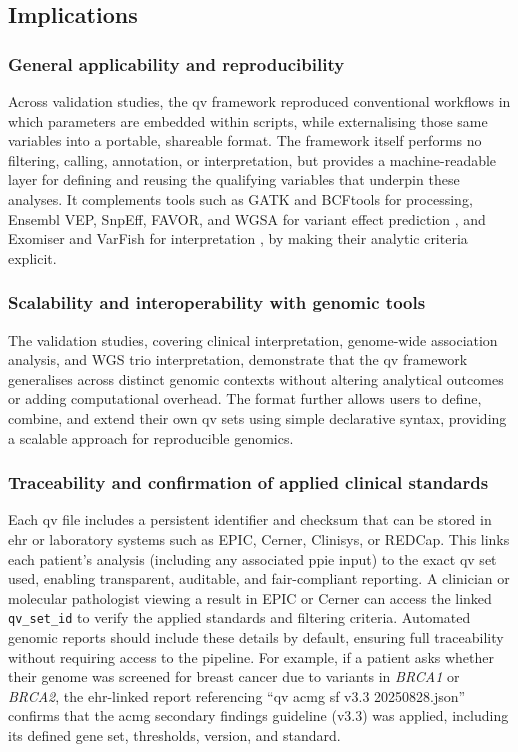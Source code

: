 \documentclass[unnumsec,webpdf,contemporary,large,namedate]{oup-authoring-template}
\begin{document}
\subsection{Implications}
\subsubsection{General applicability and reproducibility}
Across validation studies, the \ac{qv} framework reproduced conventional workflows in which parameters are embedded within scripts, while externalising those same variables into a portable, shareable format. The framework itself performs no filtering, calling, annotation, or interpretation, but provides a machine-readable layer for defining and reusing the qualifying variables that underpin these analyses. It complements tools such as GATK and BCFtools for processing, Ensembl VEP, SnpEff, FAVOR, and WGSA for variant effect prediction \citep{2024riccioVariantEffectPredictors}, and Exomiser and VarFish for interpretation \citep{2020ciprianiImprovedPhenotypeDrivenTool, 2020holtgreweVarFishComprehensiveDNA}, by making their analytic criteria explicit.

\subsubsection{Scalability and interoperability with genomic tools}
The validation studies, covering clinical interpretation, genome-wide association analysis, and WGS trio interpretation, demonstrate that the \ac{qv} framework generalises across distinct genomic contexts without altering analytical outcomes or adding computational overhead. The format further allows users to define, combine, and extend their own \ac{qv} sets using simple declarative syntax, providing a scalable approach for reproducible genomics.

\subsubsection{Traceability and confirmation of applied clinical standards}
Each \ac{qv} file includes a persistent identifier and checksum that can be stored in \ac{ehr} or laboratory systems such as EPIC, Cerner, Clinisys, or REDCap. This links each patient’s analysis (including any associated \ac{ppie} input) to the exact \ac{qv} set used, enabling transparent, auditable, and \ac{fair}-compliant reporting.  
A clinician or molecular pathologist viewing a result in EPIC or Cerner can access the linked \texttt{qv\_set\_id} to verify the applied standards and filtering criteria. Automated genomic reports should include these details by default, ensuring full traceability without requiring access to the pipeline.  
For example, if a patient asks whether their genome was screened for breast cancer due to variants in \textit{BRCA1} or \textit{BRCA2}, the \ac{ehr}-linked report referencing ``qv acmg sf v3.3 20250828.json'' confirms that the \ac{acmg} secondary findings guideline (v3.3) \citep{miller2023acmg} was applied, including its defined gene set, thresholds, version, and standard.  
\end{document}
